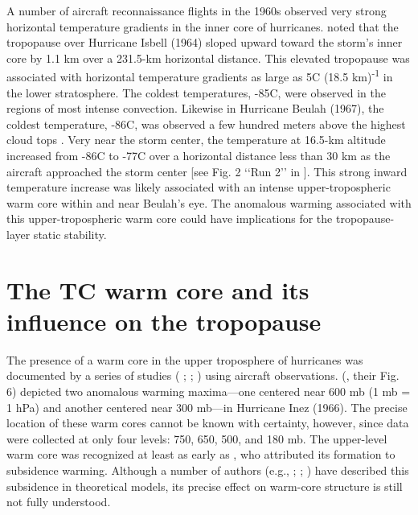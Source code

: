 A number of aircraft reconnaissance flights in the 1960s observed very strong horizontal temperature gradients in the inner core of hurricanes.
\cite{Penn1966} noted that the tropopause over Hurricane Isbell (1964) sloped upward toward the storm’s inner core by 1.1 km over a 231.5-km horizontal distance.
This elevated tropopause was associated with horizontal temperature gradients as large as 5\textdegree{}C (18.5 km)\textsuperscript{-1} in the lower stratosphere.
The coldest temperatures, -85\textdegree{}C, were observed in the regions of most intense convection.
Likewise in Hurricane Beulah (1967), the coldest temperature, -86\textdegree{}C, was observed a few hundred meters above the highest cloud tops \citep{Waco1970}.
Very near the storm center, the temperature at 16.5-km altitude increased from -86\textdegree{}C to -77\textdegree{}C over a horizontal distance less than 30 km as the aircraft approached the storm center [see Fig. 2 ‘‘Run 2’’ in \cite{Waco1970}].
This strong inward temperature increase was likely associated with an intense upper-tropospheric warm core within and near Beulah’s eye.
The anomalous warming associated with this upper-tropospheric warm core could have implications for the tropopause-layer static stability.

\section{The TC warm core and its influence on the tropopause}

The presence of a warm core in the upper troposphere of hurricanes was documented by a series of studies (\citeauthor{LaSeurHawkins1963} \citeyear{LaSeurHawkins1963}; \citeauthor{HawkinsRubsam1968} \citeyear{HawkinsRubsam1968}; \citeauthor{HawkinsImbembo1976} \citeyear{HawkinsImbembo1976}) using aircraft observations.
\citeauthor{HawkinsImbembo1976} (\citeyear{HawkinsImbembo1976}, their Fig. 6) depicted two anomalous warming maxima---one centered near 600 mb (1 mb = 1 hPa) and another centered near 300 mb---in Hurricane Inez (1966).
The precise location of these warm cores cannot be known with certainty, however, since data were collected at only four levels: 750, 650, 500, and 180 mb.
The upper-level warm core was recognized at least as early as \cite{Haurwitz1935}, who attributed its formation to subsidence warming.
Although a number of authors (e.g., \citeauthor{Malkus1958} \citeyear{Malkus1958}; \citeauthor{Willoughby1979} \citeyear{Willoughby1979}; \citeauthor{Smith1980} \citeyear{Smith1980}) have described this subsidence in theoretical models, its precise effect on warm-core structure is still not fully understood.


